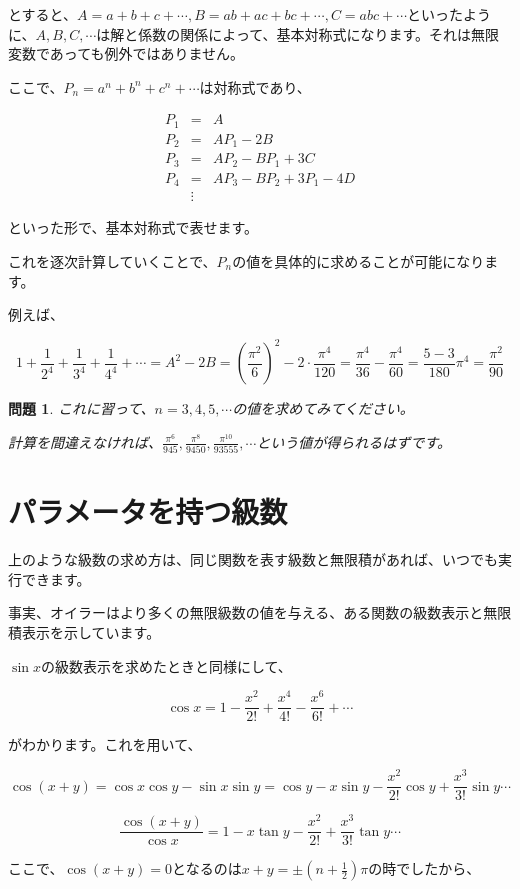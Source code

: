 \documentclass[a4paper]{jsarticle}
\theoremstyle{break}
\newtheorem*{prb}{問題}
\begin{document}
とすると、$A=a+b+c+\cdots,B=ab+ac+bc+\cdots,C=abc+\cdots$といったように、$A,B,C,\cdots$は解と係数の関係によって、基本対称式になります。それは無限変数であっても例外ではありません。

ここで、$P_n=a^n+b^n+c^n+\cdots$は対称式であり、

\begin{eqnarray*}
P_1&=&A\\
P_2&=&AP_1-2B\\
P_3&=&AP_2-BP_1+3C\\
P_4&=&AP_3-BP_2+3P_1-4D\\
&\vdots&
\end{eqnarray*}

といった形で、基本対称式で表せます。

これを逐次計算していくことで、$P_n$の値を具体的に求めることが可能になります。

例えば、

\[1+\frac{1}{2^4}+\frac{1}{3^4}+\frac{1}{4^4}+\cdots=A^2-2B=\left( \frac{\pi^2}{6} \right)^2-2\cdot\frac{\pi^4}{120}=\frac{\pi^4}{36}-\frac{\pi^4}{60}=\frac{5-3}{180}\pi^4=\frac{\pi^2}{90}\]

\begin{prb}
これに習って、$n=3,4,5,\cdots$の値を求めてみてください。

計算を間違えなければ、$\displaystyle \frac{\pi^6}{945},\frac{\pi^8}{9450},\frac{\pi^{10}}{93555},\cdots$という値が得られるはずです。

\end{prb}
\section{パラメータを持つ級数}
上のような級数の求め方は、同じ関数を表す級数と無限積があれば、いつでも実行できます。

事実、オイラーはより多くの無限級数の値を与える、ある関数の級数表示と無限積表示を示しています。

$\sin x$の級数表示を求めたときと同様にして、

\[\cos x=1-\frac{x^2}{2!}+\frac{x^4}{4!}-\frac{x^6}{6!}+\cdots\]

がわかります。これを用いて、

\[\cos(x+y)=\cos x\cos y-\sin x \sin y=\cos y -x\sin y -\frac{x^2}{2!}\cos y+\frac{x^3}{3!}\sin y\cdots\]

\[\frac{\cos (x+y)}{\cos x}=1 -x\tan y- \frac{x^2}{2!}+\frac{x^3}{3!}\tan y\cdots\]

ここで、$\cos (x+y)=0$となるのは$x+y=\pm \left(n+\frac{1}{2}\right)\pi$の時でしたから、
\end{document}

